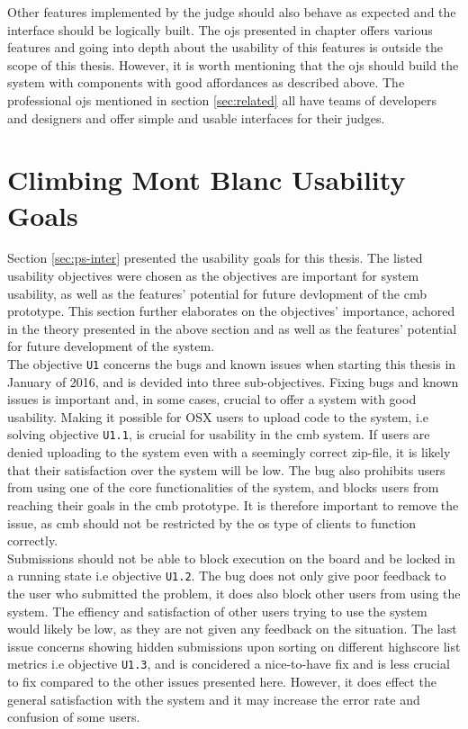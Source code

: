 Other features implemented by the judge should also behave as expected and the interface should be logically built. The \glspl{oj} presented in chapter offers various features and going into depth about the usability of this features is outside the scope of this thesis. However, it is worth mentioning that the \glspl{oj} should build the system with components with good affordances as described above. The professional \glspl{oj} mentioned in section \ref{sec:related} all have teams of developers and designers and offer simple and usable interfaces for their judges.

\section{Climbing Mont Blanc Usability Goals}
\label{sec:cmb-usability}
Section \ref{sec:ps-inter} presented the usability goals for this thesis. The listed usability objectives were chosen as the objectives are important for system usability, as well as the features' potential for future devlopment of the \gls{cmb} prototype. This section further elaborates on the objectives' importance, achored in the theory presented in the above section and as well as the features' potential for future development of the system. \\

The objective \texttt{U1} concerns the bugs and known issues when starting this thesis in January of 2016, and is devided into three sub-objectives. Fixing bugs and known issues is important and, in some cases, crucial to offer a system with good usability. Making it possible for OSX users to upload code to the system, i.e solving objective \texttt{U1.1}, is crucial for usability in the \gls{cmb} system. If users are denied uploading to the system even with a seemingly correct zip-file, it is likely that their satisfaction over the system will be low. The bug also prohibits users from using one of the core functionalities of the system, and blocks users from reaching their goals in the \gls{cmb} prototype. It is therefore important to remove the issue, as \gls{cmb} should not be restricted by the \gls{os} type of clients to function correctly. \\

Submissions should not be able to block execution on the board and be locked in a running state i.e objective \texttt{U1.2}. The bug does not only give poor feedback to the user who submitted the problem, it does also block other users from using the system. The effiency and satisfaction of other users trying to use the system would likely be low, as they are not given any feedback on the situation. The last issue concerns showing hidden submissions upon sorting on different highscore list metrics i.e objective \texttt{U1.3}, and is concidered a nice-to-have fix and is less crucial to fix compared to the other issues presented here. However, it does effect the general satisfaction with the system and it may increase the error rate and confusion of some users. \\

